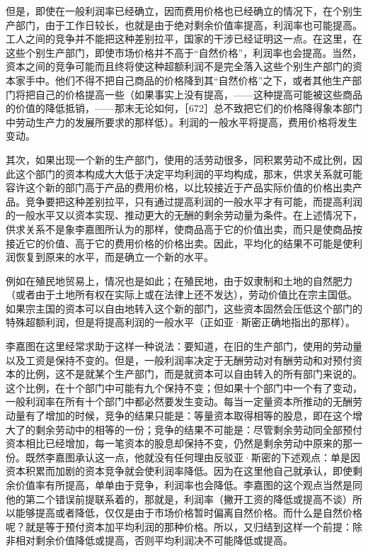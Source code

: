 但是，即使在一般利润率已经确立，因而费用价格也已经确立的情况下，在个别生产部门，由于工作日较长，也就是由于绝对剩余价值率提高，利润率也可能提高。工人之间的竞争并不能把这种差别拉平，国家的干涉已经证明这一点。在这里，在这些个别生产部门，即使市场价格并不高于“自然价格”，利润率也会提高。当然，资本之间的竞争可能而且终将使这种超额利润不是完全落入这些个别生产部门的资本家手中。他们不得不把自己商品的价格降到其“自然价格”之下，或者其他生产部门将把自己的价格提高一些（如果事实上没有提高，——这种提高可能被这些商品的价值的降低抵销，——那末无论如何，［672］总不致把它们的价格降得象本部门中劳动生产力的发展所要求的那样低）。利润的一般水平将提高，费用价格将发生变动。

其次，如果出现一个新的生产部门，使用的活劳动很多，同积累劳动不成比例，因此这个部门的资本构成大大低于决定平均利润的平均构成，那末，供求关系就可能容许这个新的部门高于产品的费用价格，以比较接近于产品实际价值的价格出卖产品。竞争要把这种差别拉平，只有通过提高利润的一般水平才有可能，而提高利润的一般水平又以资本实现、推动更大的无酬的剩余劳动量为条件。在上述情况下，供求关系不是象李嘉图所认为的那样，使商品高于它的价值出卖，而只是使商品按接近它的价值、高于它的费用价格的价格出卖。因此，平均化的结果不可能是使利润恢复到原来的水平，而是确立一个新的水平。


例如在殖民地贸易上，情况也是如此；在殖民地，由于奴隶制和土地的自然肥力（或者由于土地所有权在实际上或在法律上还不发达），劳动价值比在宗主国低。如果宗主国的资本可以自由地转入这个新的部门，这些资本固然会压低这个部门的特殊超额利润，但是将提高利润的一般水平（正如亚·斯密正确地指出的那样）。

李嘉图在这里经常求助于这样一种说法：要知道，在旧的生产部门，使用的劳动量以及工资是保持不变的。但是，一般利润率决定于无酬劳动对有酬劳动和对预付资本的比例，这不是就某个生产部门，而是就资本可以自由转入的所有部门来说的。这个比例，在十个部门中可能有九个保持不变；但如果十个部门中一个有了变动，一般利润率在所有十个部门中都必然要发生变动。每当一定量资本所推动的无酬劳动量有了增加的时候，竞争的结果只能是：等量资本取得相等的股息，即在这个增大了的剩余劳动中的相等的一份；竞争的结果不可能是：尽管剩余劳动同全部预付资本相比已经增加，每一笔资本的股息却保持不变，仍然是剩余劳动中原来的那一份。既然李嘉图承认这一点，他就没有任何理由反驳亚·斯密的下述观点：单是因资本积累而加剧的资本竞争就会使利润率降低。因为在这里他自己就承认，即使剩余价值率有所提高，单单由于竞争，利润率也会降低。李嘉图的这个观点当然是同他的第二个错误前提联系着的，那就是，利润率（撇开工资的降低或提高不谈）所以能够提高或者降低，仅仅是由于市场价格暂时偏离自然价格。而什么是自然价格呢？就是等于预付资本加平均利润的那种价格。所以，又归结到这样一个前提：除非相对剩余价值降低或提高，否则平均利润决不可能降低或提高。


